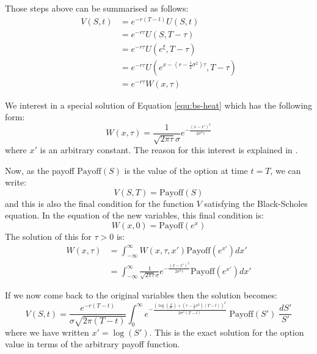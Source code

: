 Those steps above can be summarised as follows:
\begin{align*}
    V(S,t) &= e^{-r(T-t)} U(S,t) \\
           &= e^{-r \tau} U(S,T - \tau) \\
           &= e^{-r \tau} U(e^{\xi},T - \tau) \\
           &= e^{-r \tau} U \left( e^{x - \left( r - \frac{1}{2} \sigma^2 \right) \tau},T - \tau \right) \\
           &= e^{-r \tau} W(x, \tau)
\end{align*}

We interest in a special solution of Equation \ref{equ:bs-heat} which has the following form:
\begin{equation}
    W(x,\tau) = \frac{1}{\sqrt{2 \pi \tau} \sigma}e^{-\frac{(x-x')^2}{2 \sigma^2 \tau}}
\end{equation}
where $x'$ is an arbitrary constant. The reason for this interest is explained in \citep{pw_iqf2ed_2007}.

Now, as the payoff $\text{Payoff}(S)$ is the value of the option at time $t = T$, we can write:
\begin{equation}
    V(S,T) = \text{Payoff}(S)
\end{equation}
and this is also the final condition for the function $V$ satisfying the Black-Scholes equation. In the equation of the new variables, this final condition is:
\begin{equation}
    W(x,0) = \text{Payoff}(e^x)
\end{equation}
The solution of this for $\tau > 0$ is:
\begin{align}
    W(x, \tau) &= \int_{-\infty}^{\infty} W(x, \tau, x') \text{Payoff}(e^{x'}) dx' \\ 
               &= \int_{-\infty}^{\infty} \frac{1}{\sqrt{2 \pi \tau} \sigma}e^{-\frac{(x-x')^2}{2 \sigma^2 \tau}} \text{Payoff}(e^{x'}) dx'
\end{align}

If we now come back to the original variables then the solution becomes:
\begin{equation}
    V(S,t) = \frac{e^{-r(T-t)}}{\sigma \sqrt{2 \pi (T-t)}} \int_0^\infty e^{-\frac{\left( \log(\frac{S}{S'}) + \left( r - \frac{1}{2} \sigma^2 \right)(T-t) \right)^2}{2 \sigma^2 (T-t)}} \; \text{Payoff}(S') \; \frac{dS'}{S'}
    \label{equ:exact_bsm}
\end{equation}
where we have written $x' = \log(S')$. This is the exact solution for the option value in terms of the arbitrary payoff function.


